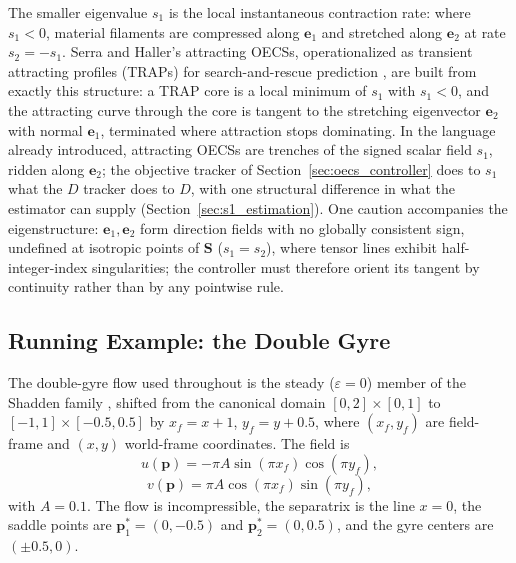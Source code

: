 \documentclass[lettersize,journal]{IEEEtran}
\begin{document}
The smaller eigenvalue $s_1$ is the local instantaneous contraction
rate: where $s_1 < 0$, material filaments are compressed along
$\mathbf{e}_1$ and stretched along $\mathbf{e}_2$ at rate $s_2 = -s_1$.
Serra and Haller's attracting OECSs, operationalized as transient
attracting profiles (TRAPs) for search-and-rescue prediction
\cite{17,36}, are built from exactly this structure: a TRAP core is a
local minimum of $s_1$ with $s_1 < 0$, and the attracting curve through
the core is tangent to the stretching eigenvector $\mathbf{e}_2$ with
normal $\mathbf{e}_1$, terminated where attraction stops dominating. In
the language already introduced, attracting OECSs are trenches of the
signed scalar field $s_1$, ridden along $\mathbf{e}_2$; the objective
tracker of Section~\ref{sec:oecs_controller} does to $s_1$ what the
$D$ tracker does to $D$, with one structural difference in what
the estimator can supply (Section~\ref{sec:s1_estimation}). One caution
accompanies the eigenstructure: $\mathbf{e}_1, \mathbf{e}_2$ form
direction fields with no globally consistent sign, undefined at
isotropic points of $\mathbf{S}$ ($s_1 = s_2$), where tensor lines
exhibit half-integer-index singularities; the controller must therefore
orient its tangent by continuity rather than by any pointwise rule.

\subsection{Running Example: the Double Gyre}
\label{sec:dg_example}

The double-gyre flow used throughout is the steady ($\varepsilon = 0$)
member of the Shadden family \cite{8}, shifted from the canonical domain
$[0,2] \times [0,1]$ to $[-1,1] \times [-0.5, 0.5]$ by
$x_f = x + 1$, $y_f = y + 0.5$, where $(x_f, y_f)$ are field-frame and
$(x, y)$ world-frame coordinates. The field is
\begin{equation}
    u(\mathbf{p}) = -\pi A \sin(\pi x_f) \cos(\pi y_f), \label{eq:dg_u}
\end{equation}
\begin{equation}
    v(\mathbf{p}) = \pi A \cos(\pi x_f) \sin(\pi y_f), \label{eq:dg_v}
\end{equation}
with $A = 0.1$. The flow is incompressible, the separatrix is the line
$x = 0$, the saddle points are $\mathbf{p}^*_1 = (0, -0.5)$ and
$\mathbf{p}^*_2 = (0, 0.5)$, and the gyre centers are $(\pm 0.5, 0)$.
\end{document}
